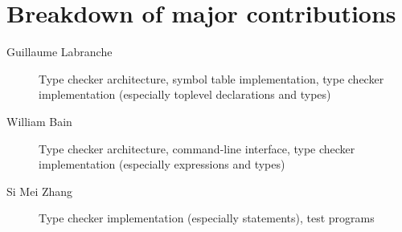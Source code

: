 \documentclass[oneside]{article}
\begin{document}
\section{Breakdown of major contributions}

\begin{description}
    \item[Guillaume Labranche] Type checker architecture, symbol table implementation, type checker implementation (especially toplevel declarations and types)
    \item[William Bain] Type checker architecture, command-line interface, type checker implementation (especially expressions and types)
    \item[Si Mei Zhang] Type checker implementation (especially statements), test programs
\end{description}
\end{document}

